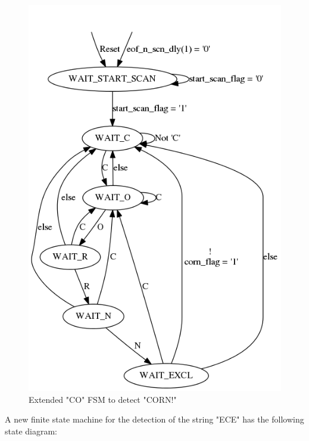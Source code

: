 \documentclass{article}
\begin{document}
	\begin{figure}[H]
		\begin{center}
			\includegraphics[scale=0.3]{../graphviz/part_3_state_diagram_CORN.png}
			\caption{Extended "CO" FSM to detect "CORN!"}
		\end{center}
	\end{figure}

A new finite state machine for the detection of the string "ECE" has the following state diagram:
\end{document}
